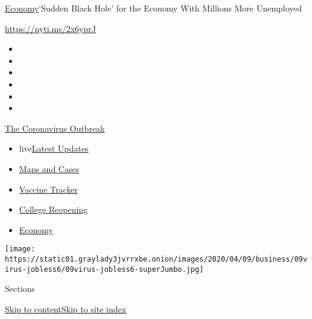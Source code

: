 \href{/section/business/economy}{Economy}\textbar{}`Sudden Black Hole'
for the Economy With Millions More Unemployed

\url{https://nyti.ms/2x6yprJ}

\begin{itemize}
\item
\item
\item
\item
\item
\item
\end{itemize}

\href{https://www.nytimes3xbfgragh.onion/news-event/coronavirus?action=click\&pgtype=Article\&state=default\&region=TOP_BANNER\&context=storylines_menu}{The
Coronavirus Outbreak}

\begin{itemize}
\tightlist
\item
  live\href{https://www.nytimes3xbfgragh.onion/2020/08/04/world/coronavirus-covid-19.html?action=click\&pgtype=Article\&state=default\&region=TOP_BANNER\&context=storylines_menu}{Latest
  Updates}
\item
  \href{https://www.nytimes3xbfgragh.onion/interactive/2020/us/coronavirus-us-cases.html?action=click\&pgtype=Article\&state=default\&region=TOP_BANNER\&context=storylines_menu}{Maps
  and Cases}
\item
  \href{https://www.nytimes3xbfgragh.onion/interactive/2020/science/coronavirus-vaccine-tracker.html?action=click\&pgtype=Article\&state=default\&region=TOP_BANNER\&context=storylines_menu}{Vaccine
  Tracker}
\item
  \href{https://www.nytimes3xbfgragh.onion/2020/08/02/us/covid-college-reopening.html?action=click\&pgtype=Article\&state=default\&region=TOP_BANNER\&context=storylines_menu}{College
  Reopening}
\item
  \href{https://www.nytimes3xbfgragh.onion/live/2020/08/03/business/stock-market-today-coronavirus?action=click\&pgtype=Article\&state=default\&region=TOP_BANNER\&context=storylines_menu}{Economy}
\end{itemize}

\texttt{[image: https://static01.graylady3jvrrxbe.onion/images/2020/04/09/business/09virus-jobless6/09virus-jobless6-superJumbo.jpg]}

Sections

\protect\hyperlink{site-content}{Skip to
content}\protect\hyperlink{site-index}{Skip to site index}

